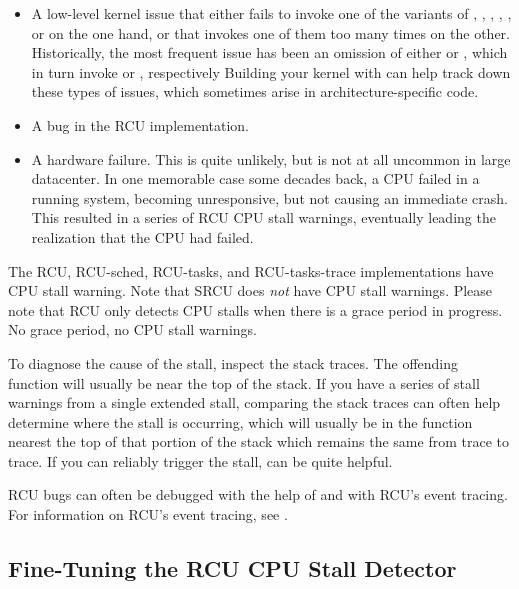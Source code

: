 \begin{itemize}
\item	A low-level kernel issue that either fails to invoke one of the
	variants of , , ,
	, , or  on the one
	hand, or that invokes one of them too many times on the other.
	Historically, the most frequent issue has been an omission
	of either  or , which in turn invoke
	 or , respectively
	Building your
	kernel with  can help track down these types
	of issues, which sometimes arise in architecture-specific code.

\item	A bug in the RCU implementation.

\item	A hardware failure.
	This is quite unlikely, but is not at all
	uncommon in large datacenter.
	In one memorable case some decades
	back, a CPU failed in a running system, becoming unresponsive,
	but not causing an immediate crash.
	This resulted in a series
	of RCU CPU stall warnings, eventually leading the realization
	that the CPU had failed.
\end{itemize}

The RCU, RCU-sched, RCU-tasks, and RCU-tasks-trace implementations have
CPU stall warning.
Note that SRCU does \emph{not} have CPU stall warnings.
Please note that RCU only detects CPU stalls when there is a grace period
in progress.
No grace period, no CPU stall warnings.

To diagnose the cause of the stall, inspect the stack traces.
The offending function will usually be near the top of the stack.
If you have a series of stall warnings from a single extended stall,
comparing the stack traces can often help determine where the stall
is occurring, which will usually be in the function nearest the top of
that portion of the stack which remains the same from trace to trace.
If you can reliably trigger the stall,  can be quite helpful.

RCU bugs can often be debugged with the help of 
and with RCU's event tracing.
For information on RCU's event tracing,
see .


\subsection{Fine-Tuning the RCU CPU Stall Detector}

